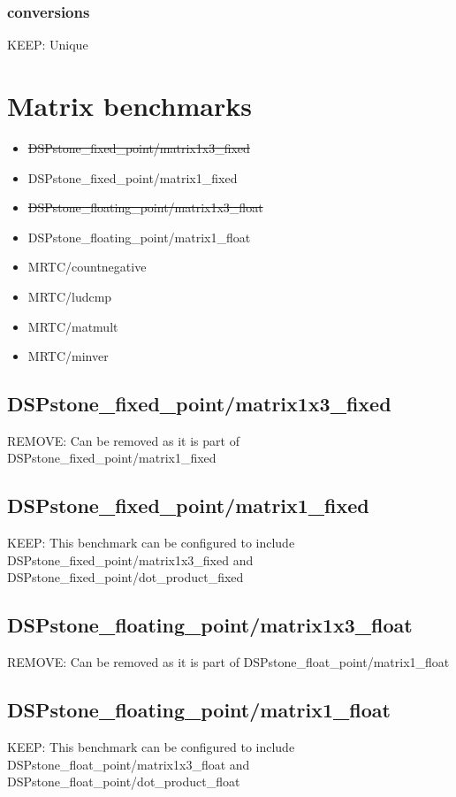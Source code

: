 \documentclass[a4paper]{article}
\begin{document}
    \subsubsection{conversions}
    	KEEP: Unique
    

\section{Matrix benchmarks}

\begin{itemize}
	\item \st{DSPstone\_fixed\_point/matrix1x3\_fixed}
	\item DSPstone\_fixed\_point/matrix1\_fixed
	\item \st{DSPstone\_floating\_point/matrix1x3\_float}
	\item DSPstone\_floating\_point/matrix1\_float
	\item MRTC/countnegative
    \item MRTC/ludcmp
    \item MRTC/matmult
    \item MRTC/minver
\end{itemize}

  \subsection{DSPstone\_fixed\_point/matrix1x3\_fixed}
      REMOVE: Can be removed as it is part of DSPstone\_fixed\_point/matrix1\_fixed
    
    
  \subsection{DSPstone\_fixed\_point/matrix1\_fixed}
      KEEP: This benchmark can be configured to include DSPstone\_fixed\_point/matrix1x3\_fixed and DSPstone\_fixed\_point/dot\_product\_fixed


  \subsection{DSPstone\_floating\_point/matrix1x3\_float}
  REMOVE: Can be removed as it is part of DSPstone\_float\_point/matrix1\_float
  \subsection{DSPstone\_floating\_point/matrix1\_float}
  KEEP: This benchmark can be configured to include DSPstone\_float\_point/matrix1x3\_float and DSPstone\_float\_point/dot\_product\_float
  
\end{document}
